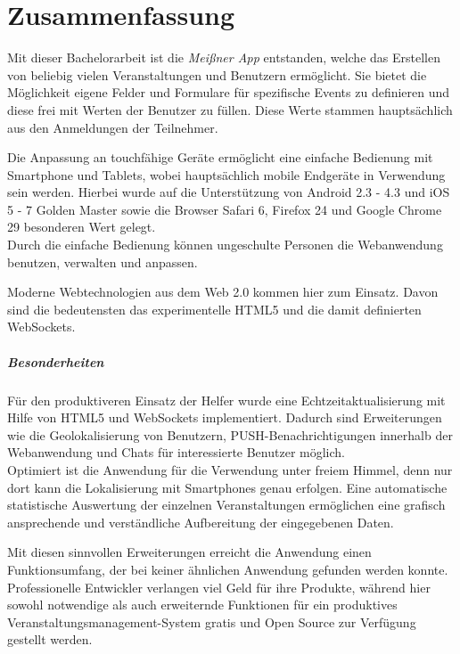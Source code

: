 \chapter{Zusammenfassung}
Mit dieser Bachelorarbeit ist die \emph{Meißner App} entstanden, welche das Erstellen von beliebig vielen Veranstaltungen und Benutzern ermöglicht. Sie bietet die Möglichkeit eigene Felder und Formulare für spezifische Events zu definieren und diese frei mit Werten der Benutzer zu füllen. Diese Werte stammen hauptsächlich aus den Anmeldungen der Teilnehmer.\par

Die Anpassung an touchfähige Geräte ermöglicht eine einfache Bedienung mit Smartphone und Tablets, wobei hauptsächlich mobile Endgeräte in Verwendung sein werden. Hierbei wurde auf die Unterstützung von Android 2.3 - 4.3 und iOS 5 - 7 Golden Master sowie die Browser Safari 6, Firefox 24 und Google Chrome 29 besonderen Wert gelegt.\\
Durch die einfache Bedienung können ungeschulte Personen die Webanwendung benutzen, verwalten und anpassen.\par

Moderne Webtechnologien aus dem Web 2.0 kommen hier zum Einsatz. Davon sind die bedeutensten das experimentelle HTML5 und die damit definierten WebSockets.

\paragraph{Besonderheiten} 
Für den produktiveren Einsatz der Helfer wurde eine Echtzeitaktualisierung mit Hilfe von HTML5 und WebSockets implementiert. Dadurch sind Erweiterungen wie die Geolokalisierung von Benutzern, PUSH-Benachrichtigungen innerhalb der Webanwendung und Chats für interessierte Benutzer möglich.\\
Optimiert ist die Anwendung für die Verwendung unter freiem Himmel, denn nur dort kann die Lokalisierung mit Smartphones genau erfolgen. Eine automatische statistische Auswertung der einzelnen Veranstaltungen ermöglichen eine grafisch ansprechende und verständliche Aufbereitung der eingegebenen Daten.\par

Mit diesen sinnvollen Erweiterungen erreicht die Anwendung einen Funktionsumfang, der bei keiner ähnlichen Anwendung gefunden werden konnte. Professionelle Entwickler verlangen viel Geld für ihre Produkte, während hier sowohl notwendige als auch erweiternde Funktionen für ein produktives Veranstaltungsmanagement-System gratis und Open Source zur Verfügung gestellt werden.\par

